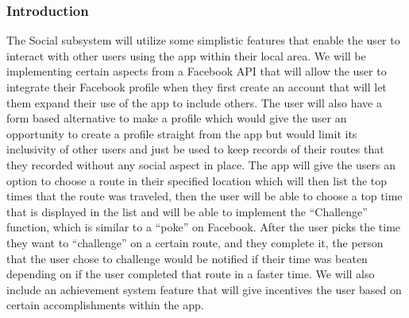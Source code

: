 ﻿\documentclass{article}
\begin{document}
\subsubsection{Introduction}
The Social subsystem will utilize some simplistic features that enable the user to interact with other users using the app within their local area. We will be implementing certain aspects from a Facebook API that will allow the user to integrate their Facebook profile when they first create an account that will let them expand their use of the app to include others. The user will also have a form based alternative to make a profile which would give the user an opportunity to create a profile straight from the app but would limit its inclusivity of other users and just be used to keep records of their routes that they recorded without any social aspect in place.
The app will give the users an option to choose a route in their specified location which will then list the top times that the route was traveled, then the user will be able to choose a top time that is displayed in the list and will be able to implement the “Challenge” function, which is similar to a “poke” on Facebook. After the user picks the time they want to “challenge” on a certain route, and they complete it, the person that the user chose to challenge would be notified if their time was beaten depending on if the user completed that route in a faster time.
We will also include an achievement system feature that will give incentives the user based on certain accomplishments within the app.
\end{document}
